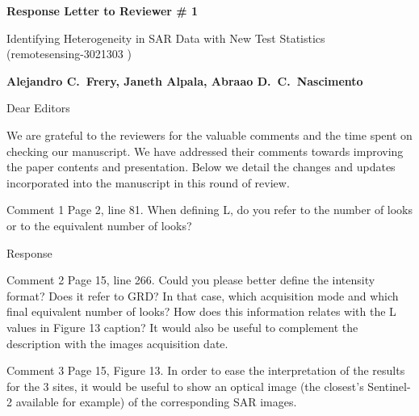\documentclass[11pt]{report}
\begin{document}
\begin{center}
\large{\textbf{Response Letter to Reviewer \# 1}}

\vglue 0.3cm

\huge{ Identifying Heterogeneity in SAR Data with New Test Statistics\\ (remotesensing-3021303 )}
\end{center}

\begin{center}
\textbf{Alejandro C.\ Frery, Janeth Alpala, Abraao D.\ C.\ Nascimento }
\end{center}

\date{\today}



\vspace{2cm}
\noindent Dear Editors
\bigskip

\noindent We are grateful to the reviewers for the valuable comments and the time spent on checking our manuscript. 
We have addressed their comments towards improving the paper contents and presentation. 
Below we detail the changes and updates incorporated into the manuscript in this round of review.

\medskip


\begin{reviewbox}{Comment 1}
Page 2, line 81. When defining L, do you refer to the number of looks or to the equivalent number of looks?

\end{reviewbox}

\begin{responsebox}{Response}

\end{responsebox}

\begin{reviewbox}{Comment 2}
Page 15, line 266. Could you please better define the intensity format? Does it refer to GRD? In that case, which acquisition mode and which final equivalent number of looks? How does this information relates with the L values in Figure 13 caption? It would also be useful to complement the description with the images acquisition date.
\end{reviewbox}

\begin{reviewbox}{Comment 3}
Page 15, Figure 13. In order to ease the interpretation of the results for the 3 sites, it would be useful to show an optical image (the closest's Sentinel-2 available for example) of the corresponding SAR images.
\end{reviewbox}
\end{document}
